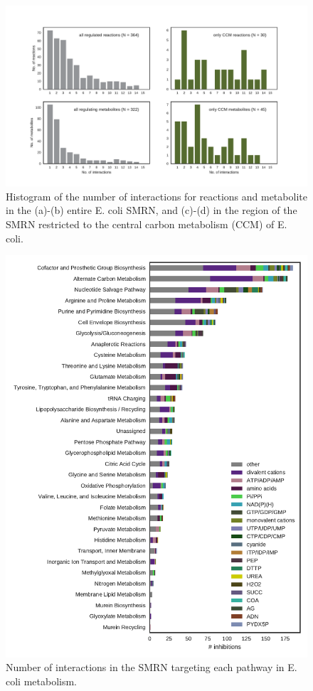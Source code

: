 \documentclass[12pt,a4paper]{article}
\begin{document}
\begin{figure}[ht!]
	\includegraphics[width=1.1\textwidth]{../manuscript/figS2.pdf}
	\caption{Histogram of the number of interactions for reactions and metabolite in the (a)-(b) entire E. coli SMRN, and (c)-(d) in the region of the SMRN restricted to the central carbon metabolism (CCM) of E. coli. }
\end{figure}

\begin{figure}[ht!]
	\includegraphics[width=\textwidth]{../manuscript/figS3.pdf}
	\caption{Number of interactions in the SMRN targeting each pathway in E. coli metabolism. 
	}
\end{figure}
\end{document}
